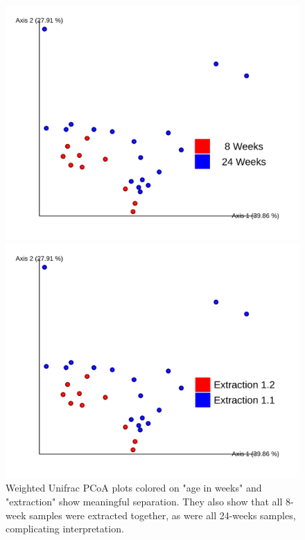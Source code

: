\documentclass[final]{beamer}
\newlength{\colwidth}
\begin{document}
\begin{frame}[t]
\begin{columns}[t]
\begin{column}{\colwidth}
  \begin{figure}[!htb]
        \begin{center}
          \includegraphics[width=\linewidth]{assets/w_unifrac_age_wk}
        \end{center}
      \endminipage
        \begin{center}
          \includegraphics[width=\linewidth]{assets/w_unifrac_extraction}
        \end{center}
      \endminipage\hfill
      \caption{Weighted Unifrac PCoA plots colored on "age in weeks" and
      "extraction" show meaningful separation. They also show that all 8-week
      samples were extracted together, as were all 24-weeks samples,
      complicating interpretation.}
      \label{fig:qpcrResults}
    \end{figure}


\end{column}
\end{columns}
\end{frame}
\end{document}
